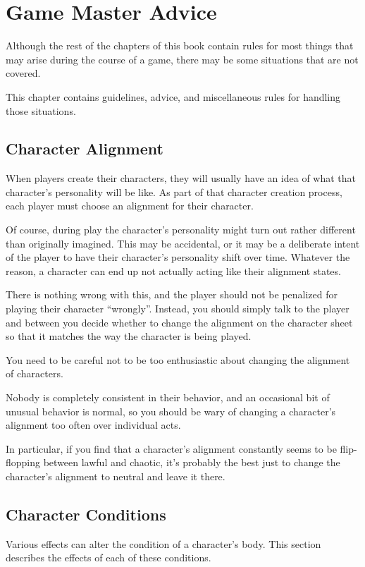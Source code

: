 \chapter[purple]{Game Master Advice}
\label{chap:Game Master Advice}
\thispagestyle{plain}


\begin{multicols*}{2}
Although the rest of the chapters of this book contain rules for most things that may arise during the course of a game, there may be some situations that are not covered.

This chapter contains guidelines, advice, and miscellaneous rules for handling those situations.

\section{Character Alignment}
When players create their characters, they will usually have an idea of what that character’s personality will be like. As part of that character creation process, each player must choose an alignment for their character.

Of course, during play the character’s personality might turn out rather different than originally imagined. This may be accidental, or it may be a deliberate intent of the player to have their character’s personality shift over time. Whatever the reason, a character can end up not actually acting like their alignment states.

There is nothing wrong with this, and the player should not be penalized for playing their character “wrongly”. Instead, you should simply talk to the player and between you decide whether to change the alignment on the character sheet so that it matches the way the character is being played.

You need to be careful not to be too enthusiastic about changing the alignment of characters.

Nobody is completely consistent in their behavior, and an occasional bit of unusual behavior is normal, so you should be wary of changing a character’s alignment too often over individual acts.

In particular, if you find that a character’s alignment constantly seems to be flip-flopping between lawful and chaotic, it’s probably the best just to change the character’s alignment to neutral and leave it there.

\section{Character Conditions}
Various effects can alter the condition of a character's body. This section describes the effects of each of these conditions.


\end{multicols*}
